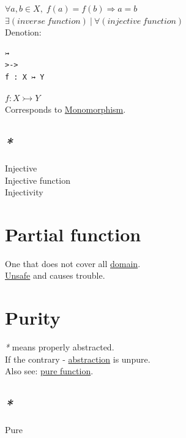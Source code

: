 \documentclass[a4paper,14pt,oneside]{book}
\begin{document}
\(\forall a,b \in X, \; f(a)=f(b) \Rightarrow a=b\)\\

\(\exists (inverse \ function) \ | \ \forall (injective \ function)\)\\

Denotion:\\
\begin{verbatim}
↣
>->
f : X ↣ Y
\end{verbatim}
\(f : X \rightarrowtail Y\)\\

Corresponds to \hyperref[orgc0276f0]{Monomorphism}.\\

\subsection{\emph{*}}
\label{sec:orge58b8fa}

\label{org01622cd}Injective\\
\label{org9c1f88b}Injective function\\
\label{org2b764bb}Injectivity\\

\section{\label{org2b4a06a}Partial function}
\label{sec:orgccda266}
One that does not cover all \hyperref[org0cadcd1]{domain}.\\
\hyperref[orgd0c0f61]{Unsafe} and causes trouble.\\

\section{\label{org8da79d6}Purity}
\label{sec:org4b8f683}
\emph{*} means properly abstracted.\\

If the contrary - \hyperref[org5f0f6fc]{abstraction} is unpure.\\

Also see: \hyperref[org710f5cf]{pure function}.\\

\subsection{\emph{*}}
\label{sec:orgf8722ba}

\label{org16d9511}Pure\\
\end{document}
